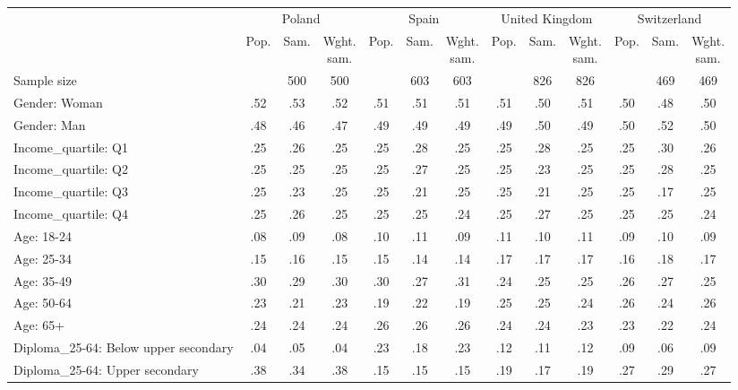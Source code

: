 
\begin{tabular}[t]{lcccccccccccc}
\toprule
\multicolumn{1}{c}{} & \multicolumn{3}{c}{Poland} & \multicolumn{3}{c}{Spain} & \multicolumn{3}{c}{United Kingdom} & \multicolumn{3}{c}{Switzerland} \\
\cmidrule(l{3pt}r{3pt}){2-4} \cmidrule(l{3pt}r{3pt}){5-7} \cmidrule(l{3pt}r{3pt}){8-10} \cmidrule(l{3pt}r{3pt}){11-13}
  & Pop. & Sam. & \makecell{Wght.\\sam.} & Pop. & Sam. & \makecell{Wght.\\sam.} & Pop. & Sam. & \makecell{Wght.\\sam.} & Pop. & Sam. & \makecell{Wght.\\sam.}\\
\midrule
Sample size &  & 500 & 500 &  & 603 & 603 &  & 826 & 826 &  & 469 & 469\\
\addlinespace
Gender: Woman & .52 & .53 & .52 & .51 & .51 & .51 & .51 & .50 & .51 & .50 & .48 & .50\\
Gender: Man & .48 & .46 & .47 & .49 & .49 & .49 & .49 & .50 & .49 & .50 & .52 & .50\\
\addlinespace
Income\_quartile: Q1 & .25 & .26 & .25 & .25 & .28 & .25 & .25 & .28 & .25 & .25 & .30 & .26\\
Income\_quartile: Q2 & .25 & .25 & .25 & .25 & .27 & .25 & .25 & .23 & .25 & .25 & .28 & .25\\
Income\_quartile: Q3 & .25 & .23 & .25 & .25 & .21 & .25 & .25 & .21 & .25 & .25 & .17 & .25\\
Income\_quartile: Q4 & .25 & .26 & .25 & .25 & .25 & .24 & .25 & .27 & .25 & .25 & .25 & .24\\
\addlinespace
Age: 18-24 & .08 & .09 & .08 & .10 & .11 & .09 & .11 & .10 & .11 & .09 & .10 & .09\\
Age: 25-34 & .15 & .16 & .15 & .15 & .14 & .14 & .17 & .17 & .17 & .16 & .18 & .17\\
Age: 35-49 & .30 & .29 & .30 & .30 & .27 & .31 & .24 & .25 & .25 & .26 & .27 & .25\\
Age: 50-64 & .23 & .21 & .23 & .19 & .22 & .19 & .25 & .25 & .24 & .26 & .24 & .26\\
Age: 65+ & .24 & .24 & .24 & .26 & .26 & .26 & .24 & .24 & .23 & .23 & .22 & .24\\
\addlinespace
Diploma\_25-64: Below upper secondary & .04 & .05 & .04 & .23 & .18 & .23 & .12 & .11 & .12 & .09 & .06 & .09\\
Diploma\_25-64: Upper secondary & .38 & .34 & .38 & .15 & .15 & .15 & .19 & .17 & .19 & .27 & .29 & .27\\

\end{tabular}
